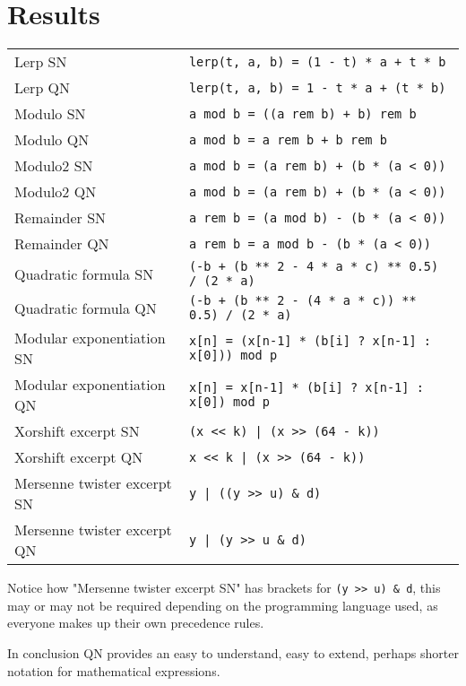 \documentclass[twoside]{article}
\begin{document}
    \section{Results}
        \begin{center}
        \begin{tabular}{ll}
            \hline
            Lerp SN & \texttt{lerp(t, a, b) = (1 - t) * a + t * b}\\
            Lerp QN & \texttt{lerp(t, a, b) = 1 - t * a + (t * b)}\vspace{5px}\\
            Modulo SN & \texttt{a mod b = ((a rem b) + b) rem b}\\
            Modulo QN & \texttt{a mod b = a rem b + b rem b}\vspace{5px}\\
            Modulo2 SN & \texttt{a mod b = (a rem b) + (b * (a < 0))}\\
            Modulo2 QN & \texttt{a mod b = (a rem b) + (b * (a < 0))}\vspace{5px}\\
            Remainder SN & \texttt{a rem b = (a mod b) - (b * (a < 0))}\\
            Remainder QN & \texttt{a rem b = a mod b - (b * (a < 0))}\vspace{5px}\\
            Quadratic formula SN & \texttt{(-b + (b ** 2 - 4 * a * c) ** 0.5) / (2 * a)}\\
            Quadratic formula QN & \texttt{(-b + (b ** 2 - (4 * a * c)) ** 0.5) / (2 * a)}\vspace{5px}\\
            Modular exponentiation SN & \texttt{x[n] = (x[n-1] * (b[i] ?‌ x[n-1] :‌ x[0])) mod p}\\
            Modular exponentiation QN & \texttt{x[n] = x[n-1] * (b[i] ?‌ x[n-1] :‌ x[0]) mod p}\vspace{5px}\\
            Xorshift excerpt SN & \texttt{(x <‌< k) | (x >‌> (64 - k))}\\
            Xorshift excerpt QN & \texttt{x <‌< k | (x >‌> (64 - k))}\vspace{5px}\\
            Mersenne twister excerpt SN & \texttt{y | ((y >‌> u) \& d)}\\
            Mersenne twister excerpt QN & \texttt{y | (y >‌> u \& d)}\\
            \hline
        \end{tabular}
        \end{center}
        \par\vspace{5px}
            Notice how "Mersenne twister excerpt SN" has brackets for \texttt{(y >‌> u) \& d},
            this may or may not be required depending on the programming language used,
            as everyone makes up their own precedence rules.
            \par
                In conclusion QN provides an easy to understand, easy to extend, perhaps shorter notation
                for mathematical expressions.
\end{document}
